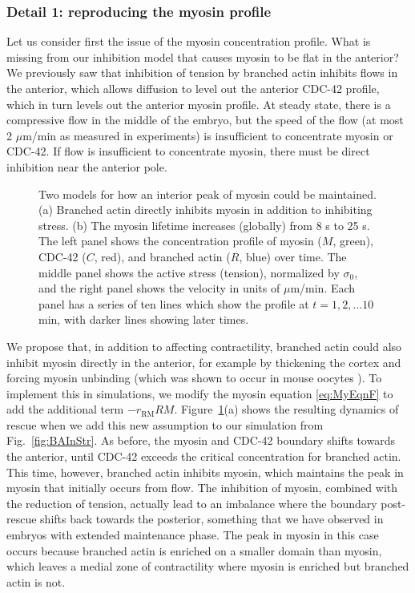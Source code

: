 \documentclass[11pt]{article}
\newcommand{\6}[1]{#1_{\text{6}}}
\newcommand{\3}[1]{#1_{\text{3}}}
\begin{document}
\subsubsection{Detail 1: reproducing the myosin profile}
Let us consider first the issue of the myosin concentration profile. What is missing from our inhibition model that causes myosin to be flat in the anterior? We previously saw that inhibition of tension by branched actin inhibits flows in the anterior, which allows diffusion to level out the anterior CDC-42 profile, which in turn levels out the anterior myosin profile. At steady state, there is a compressive flow in the middle of the embryo, but the speed of the flow (at most 2 $\mu$m/min as measured in experiments) is insufficient to concentrate myosin or CDC-42. If flow is insufficient to concentrate myosin, there must be direct inhibition near the anterior pole.



\begin{figure}
\centering
{}
\caption{\label{fig:BAIn} Two models for how an interior peak of myosin could be maintained. (a) Branched actin directly inhibits myosin in addition to inhibiting stress. (b) The myosin lifetime increases (globally) from 8 s to 25 s. The left panel shows the concentration profile of myosin ($M$, green), CDC-42 ($C$, red), and branched actin ($R$, blue) over time. The middle panel shows the active stress (tension), normalized by $\sigma_0$, and the right panel shows the velocity in units of $\mu$m/min. Each panel has a series of ten lines which show the profile at $t=1, 2, \dots 10$ min, with darker lines showing later times.}
\end{figure}

We propose that, in addition to affecting contractility, branched actin could also inhibit myosin directly in the anterior, for example by thickening the cortex and forcing myosin unbinding (which was shown to occur in mouse oocytes \cite{chaigne2015narrow}). To implement this in simulations, we modify the myosin equation \eqref{eq:MyEqnF} to add the additional term $-r_\text{RM} R M$. Figure\ \ref{fig:BAIn}(a) shows the resulting dynamics of rescue when we add this new assumption to our simulation from Fig.\ \ref{fig:BAInStr}. As before, the myosin and CDC-42 boundary shifts towards the anterior, until CDC-42 exceeds the critical concentration for branched actin. This time, however, branched actin inhibits myosin, which maintains the peak in myosin that initially occurs from flow. The inhibition of myosin, combined with the reduction of tension, actually lead to an imbalance where the boundary post-rescue shifts back towards the posterior, something that we have observed in embryos with extended maintenance phase. The peak in myosin in this case occurs because branched actin is enriched on a smaller domain than myosin, which leaves a medial zone of contractility where myosin is enriched but branched actin is not.
\end{document}
